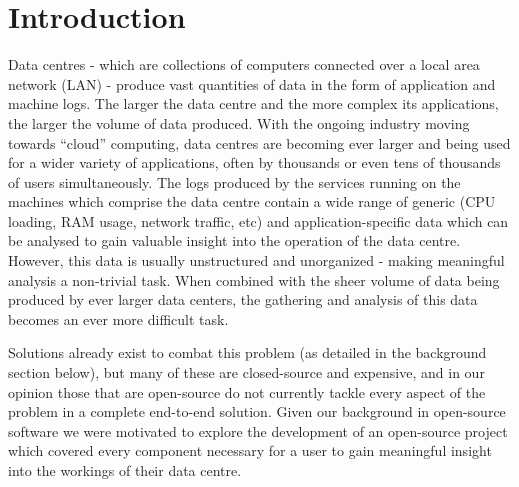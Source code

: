 \section{Introduction}

Data centres - which are collections of computers connected over a local area
network (LAN) - produce vast quantities of data in the form of application and
machine logs. The larger the data centre and the more complex its
applications, the larger the volume of data produced. With the ongoing
industry moving towards “cloud” computing, data centres are becoming ever
larger and being used for a wider variety of applications, often by thousands
or even tens of thousands of users simultaneously. The logs produced by the
services running on the machines which comprise the data centre contain a wide
range of generic (CPU loading, RAM usage, network traffic, etc) and
application-specific data which can be analysed to gain valuable insight into
the operation of the data centre. However, this data is usually unstructured
and unorganized - making meaningful analysis a non-trivial task. When combined
with the sheer volume of data being produced by ever larger data centers, the
gathering and analysis of this data becomes an ever more difficult task.

Solutions already exist to combat this problem (as detailed in the
background section below), but many of these are closed-source and
expensive, and in our opinion those that are open-source do not currently
tackle every aspect of the problem in a complete end-to-end solution. Given
our background in open-source software we were motivated to explore the
development of an open-source project which covered every component
necessary for a user to gain meaningful insight into the workings of their
data centre.
